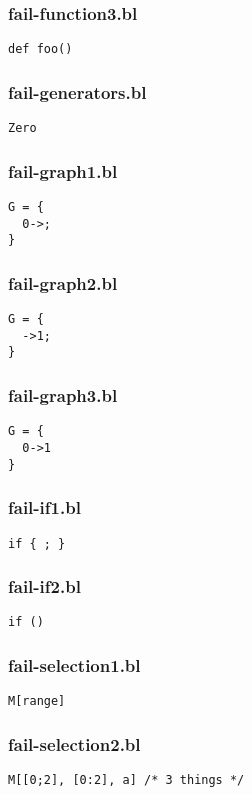 \subsubsection{fail-function3.bl}
\begin{lstlisting}
def foo()\end{lstlisting}
\subsubsection{fail-generators.bl}
\begin{lstlisting}
Zero\end{lstlisting}
\subsubsection{fail-graph1.bl}
\begin{lstlisting}
G = {
  0->;
}\end{lstlisting}
\subsubsection{fail-graph2.bl}
\begin{lstlisting}
G = {
  ->1;
}\end{lstlisting}
\subsubsection{fail-graph3.bl}
\begin{lstlisting}
G = {
  0->1
}\end{lstlisting}
\subsubsection{fail-if1.bl}
\begin{lstlisting}
if { ; }\end{lstlisting}
\subsubsection{fail-if2.bl}
\begin{lstlisting}
if ()\end{lstlisting}
\subsubsection{fail-selection1.bl}
\begin{lstlisting}
M[range]\end{lstlisting}
\subsubsection{fail-selection2.bl}
\begin{lstlisting}
M[[0;2], [0:2], a] /* 3 things */\end{lstlisting}
